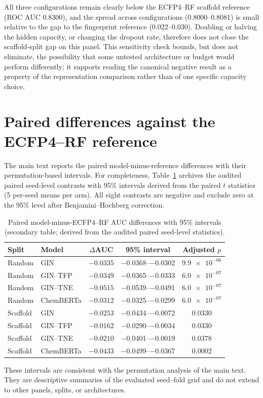 \documentclass[11pt,a4paper]{article}
\begin{document}
All three configurations remain clearly below the ECFP4--RF scaffold reference (ROC AUC \num{0.8300}), and the spread across configurations (\num{0.8000}--\num{0.8081}) is small relative to the gap to the fingerprint reference (\num{0.022}--\num{0.030}). Doubling or halving the hidden capacity, or changing the dropout rate, therefore does not close the scaffold-split gap on this panel. This sensitivity check bounds, but does not eliminate, the possibility that some untested architecture or budget would perform differently; it supports reading the canonical negative result as a property of the representation comparison rather than of one specific capacity choice.

\section{Paired differences against the ECFP4--RF reference}
\label{sec:paired_ci_si}

The main text reports the paired model-minus-reference differences with their permutation-based intervals. For completeness, Table~\ref{tab:s4_paired_ci} archives the audited paired seed-level contrasts with 95\% intervals derived from the paired $t$ statistics (\num{5} per-seed means per arm). All eight contrasts are negative and exclude zero at the 95\% level after Benjamini--Hochberg correction.

\begin{table}[h]
\centering
\caption{Paired model-minus-ECFP4--RF AUC differences with 95\% intervals (secondary table; derived from the audited paired seed-level statistics).}
\label{tab:s4_paired_ci}
\begin{tabular}{llccc}
\toprule
Split & Model & $\Delta$AUC & 95\% interval & Adjusted $p$ \\
\midrule
Random & GIN & $-\num{0.0335}$ & \numrange{-0.0368}{-0.0302} & $\num{9.9e-06}$ \\
Random & GIN--TFP & $-\num{0.0349}$ & \numrange{-0.0365}{-0.0333} & $\num{6.0e-07}$ \\
Random & GIN--TNE & $-\num{0.0515}$ & \numrange{-0.0539}{-0.0491} & $\num{6.0e-07}$ \\
Random & ChemBERTa & $-\num{0.0312}$ & \numrange{-0.0325}{-0.0299} & $\num{6.0e-07}$ \\
Scaffold & GIN & $-\num{0.0253}$ & \numrange{-0.0434}{-0.0072} & $\num{0.0330}$ \\
Scaffold & GIN--TFP & $-\num{0.0162}$ & \numrange{-0.0290}{-0.0034} & $\num{0.0330}$ \\
Scaffold & GIN--TNE & $-\num{0.0210}$ & \numrange{-0.0401}{-0.0019} & $\num{0.0378}$ \\
Scaffold & ChemBERTa & $-\num{0.0433}$ & \numrange{-0.0499}{-0.0367} & $\num{0.0002}$ \\
\bottomrule
\end{tabular}
\end{table}

These intervals are consistent with the permutation analysis of the main text. They are descriptive summaries of the evaluated seed--fold grid and do not extend to other panels, splits, or architectures.



\end{document}
